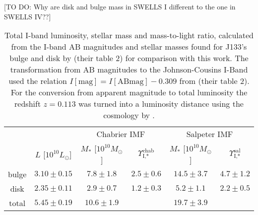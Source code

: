 [TO DO: Why are disk and bulge mass in SWELLS I different to the one in SWELLS IV??]

\begin{table*}
\centering
\begin{tabular}{cccccc}
\hline\hline
& & \multicolumn{2}{c}{Chabrier IMF} & \multicolumn{2}{c}{Salpeter IMF}\\
      &  $L$ [$10^{10}L_{\odot}$]                & $M_*$ [$10^{10}M_\odot$]               & $\Upsilon_\text{I,*}^\text{chab}$ & $M_*$ [$10^{10}M_\odot$] & $\Upsilon_\text{I,*}^\text{sal}$ \\\hline
bulge &   $3.10 \pm 0.15 $  & $7.8 \pm 1.8$ & $2.5 \pm 0.6$ & $14.5 \pm 3.7 $ & $4.7 \pm 1.2$ \\
disk  &   $2.35 \pm 0.11 $  & $2.9 \pm 0.7$ & $1.2 \pm 0.3$ & $5.2 \pm 1.1$ & $2.2 \pm 0.5$ \\
total &   $5.45 \pm 0.19$ & $10.6 \pm 1.9$& & $19.7 \pm 3.9$&\\\hline
\end{tabular}
\caption{Total I-band luminosity, stellar mass and mass-to-light ratio, calculated from the I-band AB magnitudes and stellar masses found for J133's bulge and disk by \citet{SWELLSI} (their table 2) for comparison with this work. The transformation from AB magnitudes to the Johnson-Cousins I-Band used the relation $I[\text{mag}] = I[\text{ABmag}] - 0.309$ from \citet{FG1994} (their table 2). For the conversion from apparent magnitude to total luminosity the redshift $z=0.113$ \citet{SWELLSIII} was turned into a luminosity distance using the cosmology by \citet{WMAP5cosm}. }
\label{tab:previousresults}
\end{table*}
